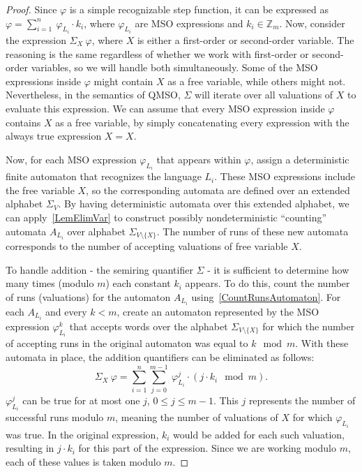 \documentclass[12pt]{article}
\theoremstyle{definition}
\begin{document}
\begin{proof}
    Since $\varphi$ is a simple recognizable step function, it can be expressed as $\varphi = \sum_{i = 1}^{n} \ \varphi_{L_i} \cdot k_i$, where $\varphi_{L_i}$ are MSO expressions and $k_i \in \mathbb{Z}_m$. Now, consider the expression $\Sigma_{X} \ \varphi$, where $X$ is either a first-order or second-order variable. The reasoning is the same regardless of whether we work with first-order or second-order variables, so we will handle both simultaneously. Some of the MSO expressions inside $\varphi$ might contain $X$ as a free variable, while others might not. Nevertheless, in the semantics of QMSO, $\Sigma$ will iterate over all valuations of $X$ to evaluate this expression. We can assume that every MSO expression inside $\varphi$ contains $X$ as a free variable, by simply concatenating every expression with the always true expression $X = X$.

    Now, for each MSO expression $\varphi_{L_i}$ that appears within $\varphi$, assign a deterministic finite automaton that recognizes the language $L_i$. These MSO expressions include the free variable $X$, so the corresponding automata are defined over an extended alphabet $\Sigma_V$. By having deterministic automata over this extended alphabet, we can apply~\cref{LemElimVar} to construct possibly nondeterministic ``counting'' automata $A_{L_i}$ over alphabet $\Sigma_{V \setminus \{X\}}$. The number of runs of these new automata corresponds to the number of accepting valuations of free variable $X$.

    To handle addition - the semiring quantifier $\Sigma$ - it is sufficient to determine how many times (modulo $m$) each constant $k_i$ appears. To do this, count the number of runs (valuations) for the automaton $A_{L_i}$ using~\cref{CountRunsAutomaton}. For each $A_{L_i}$ and every $k < m$, create an automaton represented by the MSO expression $\varphi_{L_i}^k$ that accepts words over the alphabet $\Sigma_{V \setminus \{X\}}$ for which the number of accepting runs in the original automaton was equal to $k \mod m$. With these automata in place, the addition quantifiers can be eliminated as follows:
    $$\Sigma_X \ \varphi = \sum_{i = 1}^n \sum_{j = 0}^{m-1} \ \varphi_{L_i}^j \cdot (j \cdot k_i \mod m).$$
    $\varphi_{L_i}^j$ can be true for at most one $j$, $0 \leq j \leq m-1$. This $j$ represents the number of successful runs modulo $m$, meaning the number of valuations of $X$ for which $\varphi_{L_i}$ was true. In the original expression, $k_i$ would be added for each such valuation, resulting in $j \cdot k_i$ for this part of the expression. Since we are working modulo $m$, each of these values is taken modulo $m$.
\end{proof}
\end{document}
